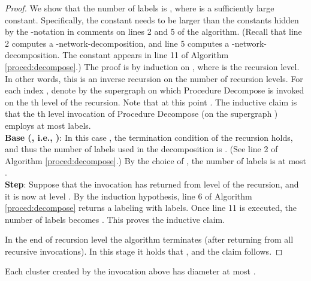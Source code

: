 \documentclass[11pt]{article}
\begin{document}
\begin{proof}
We show that the number of labels is ,
where  is a sufficiently large constant.
Specifically, the constant  needs to be larger than the constants hidden by the -notation in comments on lines 2 and 5 of the algorithm. (Recall that line 2 computes a -network-decomposition, and line 5 computes a -network-decomposition.
The constant  appears in line 11 of Algorithm \ref{proced:decompose}.)  The proof is by induction on , where  is the recursion level. In other words, this is an inverse recursion on the number of recursion levels.
For each index , denote by  the supergraph on which Procedure Decompose is invoked on the th level of the recursion. Note that at this point . The inductive claim is that the th level invocation of Procedure Decompose (on the supergraph ) employs at most  labels.\\
{\bf Base (, i.e., )}: In this case , the termination condition of the recursion holds, and thus the number of labels used in the decomposition is . (See line 2 of Algorithm \ref{proced:decompose}.) By the choice of , the number of labels is at most . \\
{\bf Step}: Suppose that the invocation has returned from level  of the recursion, and it is now at level . By the induction hypothesis, line 6 of Algorithm \ref{proced:decompose} returns a labeling with  labels. Once line 11 is executed, the number of labels becomes
. 
This proves the inductive claim.

In the end of recursion level  the algorithm terminates (after returning from all recursive invocations). In this stage it holds that , and the claim follows.
\end{proof} 
\begin{lem} \label{dec}
Each cluster created by the invocation above has diameter at most .
\end{lem}
\end{document}
